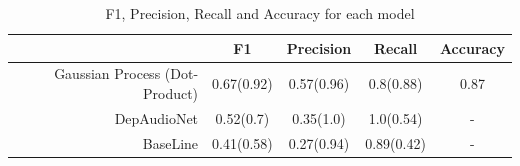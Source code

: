 \documentclass{article}
\begin{document}
\begin{enumerate}
        \begin{table}[h]
            \begin{center}
                \begin{tabular}{ | r | c | c | c | c | }
                 \hline
                                                    & \bfseries F1	& \bfseries Precision 	& \bfseries Recall      & \bfseries Accuracy \\ \hline
                 Gaussian Process (Dot-Product)		& 0.67(0.92) 	& 0.57(0.96)            & 0.8(0.88)			    & 0.87 \\ \hline
                 DepAudioNet	                    & 0.52(0.7) 	& 0.35(1.0)	    		& 1.0(0.54)             & -  \\ \hline
                 BaseLine                       	& 0.41(0.58) 	& 0.27(0.94)			& 0.89(0.42)            & -  \\ \hline
                 \end{tabular}
            \end{center}
        \caption{F1, Precision, Recall and Accuracy for each model}
        \label{summary_table}
        \end{table}
    \end{enumerate}
\end{document}
